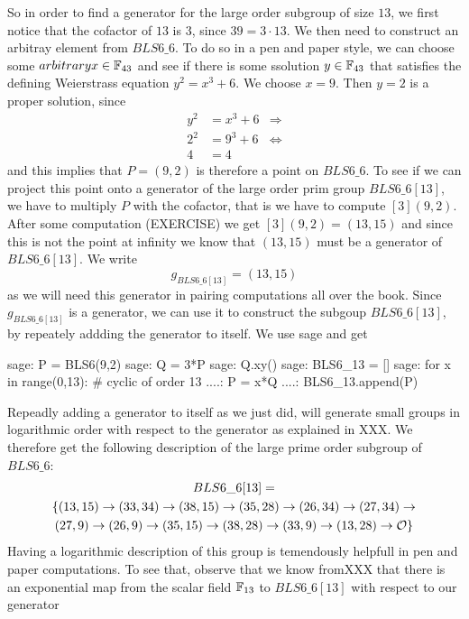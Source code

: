 So in order to find a generator for the large order subgroup of size $13$, we first notice that the cofactor of $13$ is $3$, since $39=3\cdot 13$. We then need to construct an arbitray element from $BLS6\_6$. To do so in a pen and paper style, we can choose some $arbitrary x\in\mathbb{F}_{43}$ and see if there is some ssolution $y\in\mathbb{F}_{43}$ that satisfies the defining Weierstrass equation $y^2 = x^3 + 6$. We choose $x=9$. Then $y=2$ is a proper solution, since
\begin{align*}
y^2 & = x^3 + 6 & \Rightarrow \\
2^2 & = 9^3 + 6 & \Leftrightarrow \\
4 & = 4
\end{align*}   
and this implies that $P=(9,2)$ is therefore a point on $BLS6\_6$. To see if we can project this point onto a generator of the large order prim group $BLS6\_6[13]$, we have to multiply $P$ with the cofactor, that is we have to compute $[3](9,2)$. After some computation (EXERCISE) we get $[3](9,2) = (13,15)$ and since this is not the point at infinity we know that $(13,15)$ must be a generator of $BLS6\_6[13]$. We write
\begin{equation}
g_{BLS6\_6[13]} = (13,15)
\end{equation}
as we will need this generator in pairing computations all over the book. Since $g_{BLS6\_6[13]}$ is a generator, we can use it to construct the subgoup $BLS6\_6[13]$, by repeately addding the generator to itself. We use sage and get
\begin{sagecommandline}
sage: P = BLS6(9,2)
sage: Q = 3*P
sage: Q.xy()
sage: BLS6_13 = []
sage: for x in range(0,13): # cyclic of order 13
....:     P = x*Q
....:     BLS6_13.append(P)
\end{sagecommandline}
Repeadly adding a generator to itself as we just did, will generate small groups in logarithmic order with respect to the generator as explained in XXX. We therefore get the following description of the large prime order subgroup of $BLS6\_6$:
\begin{multline}
BLS6\_6[13]=\\
\{(13,15) \rightarrow (33,34) \rightarrow  (38,15) \rightarrow  (35,28) \rightarrow (26,34) \rightarrow  (27,34) \rightarrow  \\ 
(27,9)  \rightarrow  (26,9) \rightarrow  (35,15) \rightarrow  (38,28) \rightarrow  (33,9) \rightarrow (13,28) \rightarrow  \mathcal{O}\}$$
\end{multline}
Having a logarithmic description of this group is temendously helpfull in pen and paper computations. To see that, observe that we know fromXXX that there is an exponential map from the scalar field $\mathbb{F}_{13}$ to $BLS6\_6[13]$ with respect to our generator
